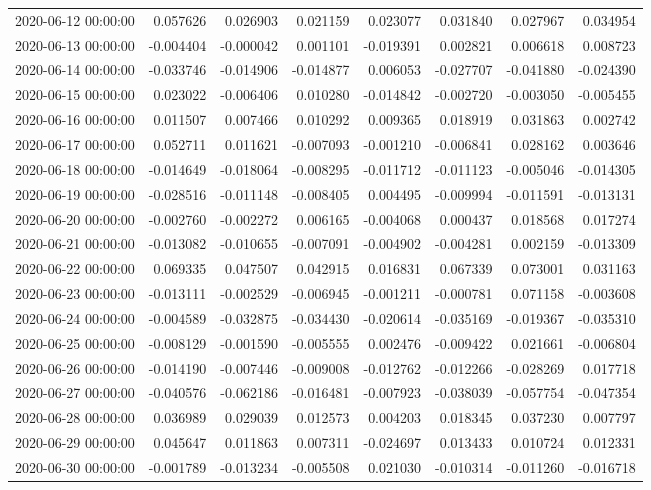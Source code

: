 \begin{tabular}{lrrrrrrr}
2020-06-12 00:00:00 & 0.057626 & 0.026903 & 0.021159 & 0.023077 & 0.031840 & 0.027967 & 0.034954 \\
2020-06-13 00:00:00 & -0.004404 & -0.000042 & 0.001101 & -0.019391 & 0.002821 & 0.006618 & 0.008723 \\
2020-06-14 00:00:00 & -0.033746 & -0.014906 & -0.014877 & 0.006053 & -0.027707 & -0.041880 & -0.024390 \\
2020-06-15 00:00:00 & 0.023022 & -0.006406 & 0.010280 & -0.014842 & -0.002720 & -0.003050 & -0.005455 \\
2020-06-16 00:00:00 & 0.011507 & 0.007466 & 0.010292 & 0.009365 & 0.018919 & 0.031863 & 0.002742 \\
2020-06-17 00:00:00 & 0.052711 & 0.011621 & -0.007093 & -0.001210 & -0.006841 & 0.028162 & 0.003646 \\
2020-06-18 00:00:00 & -0.014649 & -0.018064 & -0.008295 & -0.011712 & -0.011123 & -0.005046 & -0.014305 \\
2020-06-19 00:00:00 & -0.028516 & -0.011148 & -0.008405 & 0.004495 & -0.009994 & -0.011591 & -0.013131 \\
2020-06-20 00:00:00 & -0.002760 & -0.002272 & 0.006165 & -0.004068 & 0.000437 & 0.018568 & 0.017274 \\
2020-06-21 00:00:00 & -0.013082 & -0.010655 & -0.007091 & -0.004902 & -0.004281 & 0.002159 & -0.013309 \\
2020-06-22 00:00:00 & 0.069335 & 0.047507 & 0.042915 & 0.016831 & 0.067339 & 0.073001 & 0.031163 \\
2020-06-23 00:00:00 & -0.013111 & -0.002529 & -0.006945 & -0.001211 & -0.000781 & 0.071158 & -0.003608 \\
2020-06-24 00:00:00 & -0.004589 & -0.032875 & -0.034430 & -0.020614 & -0.035169 & -0.019367 & -0.035310 \\
2020-06-25 00:00:00 & -0.008129 & -0.001590 & -0.005555 & 0.002476 & -0.009422 & 0.021661 & -0.006804 \\
2020-06-26 00:00:00 & -0.014190 & -0.007446 & -0.009008 & -0.012762 & -0.012266 & -0.028269 & 0.017718 \\
2020-06-27 00:00:00 & -0.040576 & -0.062186 & -0.016481 & -0.007923 & -0.038039 & -0.057754 & -0.047354 \\
2020-06-28 00:00:00 & 0.036989 & 0.029039 & 0.012573 & 0.004203 & 0.018345 & 0.037230 & 0.007797 \\
2020-06-29 00:00:00 & 0.045647 & 0.011863 & 0.007311 & -0.024697 & 0.013433 & 0.010724 & 0.012331 \\
2020-06-30 00:00:00 & -0.001789 & -0.013234 & -0.005508 & 0.021030 & -0.010314 & -0.011260 & -0.016718 \\

\end{tabular}
